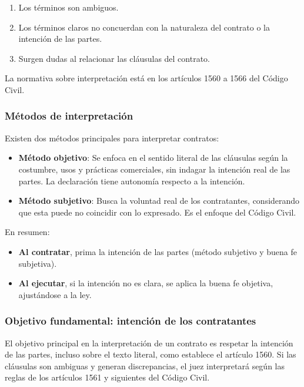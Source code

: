 \documentclass{templateNote}
\begin{document}
\begin{enumerate}[label=\alph*)]
    \item Los términos son ambiguos.
    \item Los términos claros no concuerdan con la naturaleza del contrato o la intención de las partes.
    \item Surgen dudas al relacionar las cláusulas del contrato.
\end{enumerate}

\noindent La normativa sobre interpretación está en los artículos 1560 a 1566 del Código Civil.

\subsubsection{Métodos de interpretación}
Existen dos métodos principales para interpretar contratos:

\begin{itemize}
    \item \textbf{Método objetivo}: Se enfoca en el sentido literal de las cláusulas según la costumbre, usos y prácticas comerciales, sin indagar la intención real de las partes. La declaración tiene autonomía respecto a la intención.
    \item \textbf{Método subjetivo}: Busca la voluntad real de los contratantes, considerando que esta puede no coincidir con lo expresado. Es el enfoque del Código Civil.
\end{itemize}

En resumen:

\begin{itemize}
    \item \textbf{Al contratar}, prima la intención de las partes (método subjetivo y buena fe subjetiva).
    \item \textbf{Al ejecutar}, si la intención no es clara, se aplica la buena fe objetiva, ajustándose a la ley.    
\end{itemize}

\subsubsection{Objetivo fundamental: intención de los contratantes}

El objetivo principal en la interpretación de un contrato es respetar la intención de las partes, incluso sobre el texto literal, como establece el artículo 1560. Si las cláusulas son ambiguas y generan discrepancias, el juez interpretará según las reglas de los artículos 1561 y siguientes del Código Civil.
\end{document}
